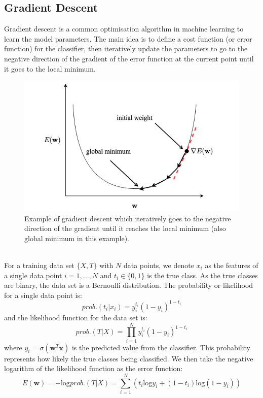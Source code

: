    \subsection{Gradient Descent} 
    Gradient descent is a common optimisation algorithm in machine learning to learn the model parameters. The main idea is to define a cost function (or error function) for the classifier, then iteratively update the parameters to go to the negative direction of the gradient of the error function at the current point until it goes to the local minimum.\\
       \begin{figure}[ht]
        \centering
        \includegraphics[width=0.8\linewidth]{images/gradient descent.png}
        \caption{Example of gradient descent which iteratively goes to the negative direction of the gradient until it reaches the local minimum (also global minimum in this example).}
        \label{fig:GD}
    \end{figure} 
    \\
    For a training data set $\{X, T\}$ with $N$ data points, we denote $x_i$ as the features of a single data point $i = 1,...,N$ and $t_i \in \{0, 1 \}$ is the true class. As the true classes are binary, the data set is a Bernoulli distribution. The probability or likelihood for a single data point is:
    \[
    prob.(t_i | x_i) = y_i^{t_i} (1 - y_i)^{1 - t_i}
    \]
    and the likelihood function for the data set is:
    \[
    prob.(T | X) = {\displaystyle \prod_{i=1}^{N} y_i^{t_i}(1 - y_i)^{1 - t_i}}
    \]
    where $y_i = \sigma(\mathbf{w}^T\mathbf{x})$ is the predicted value from the classifier. This probability represents how likely the true classes being classified. We then take the negative logarithm of the likelihood function as the error function:
    \[
    E(\mathbf{w}) = -\text{log}prob.(T|X) = {\displaystyle \sum_{i=1}^{N} (t_i \text{log}y_i + (1 - t_i)\text{log}(1 - y_i) )}
    \]
